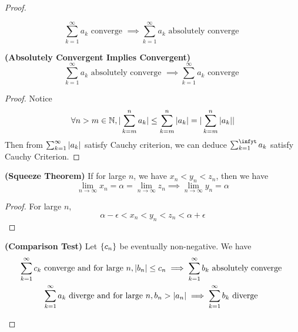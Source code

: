\documentclass{report}
\begin{document}
\begin{proof}
\begin{theorem}
\begin{equation}
\sum_{k=1}^\infty a_k\text{ converge }\implies \sum_{k=1}^\infty a_k\text{ absolutely converge }
\end{equation}
\end{theorem}
\begin{theorem}
\label{4.2.5}
\textbf{(Absolutely Convergent Implies Convergent)} 
\begin{equation}
\sum_{k=1}^\infty a_k\text{ absolutely converge }\implies \sum_{k=1}^\infty a_k\text{ converge }
\end{equation}
\end{theorem}
\begin{proof}
Notice 
\begin{equation}
\forall n>m \in\mathbb{N}, |\sum_{k=m}^n a_k|\leq \sum_{k=m}^n |a_k|=|\sum_{k=m}^n |a_k||
\end{equation}
Then from $\sum_{k=1}^\infty |a_k|$ satisfy Cauchy criterion, we can deduce $\sum_{k=1}^\infyt a_k$ satisfy Cauchy Criterion. 
\end{proof}
\begin{theorem}
\label{4.2.6}
\textbf{(Squeeze Theorem)} If for large $n$, we have  $x_n<y_n<z_n$, then we have
 \begin{equation}
\lim_{n\to\infty}x_n=\alpha =\lim_{n\to\infty}z_n\implies \lim_{n\to\infty}y_n=\alpha 
\end{equation}
\end{theorem}
\begin{proof}
For large $n$, 
 \begin{equation}
\alpha -\epsilon <x_n<y_n<z_n<\alpha +\epsilon 
\end{equation}
\end{proof}
\begin{theorem}
\label{4.2.7}
\textbf{(Comparison Test)} Let $\{ c_n \}$ be eventually non-negative. We have
\begin{gather}
  \sum_{k=1}^\infty c_k\text{ converge and for large }n, |b_n|\leq c_n\implies \sum_{k=1}^\infty b_k\text{ absolutely converge }\\
  \sum_{k=1}^\infty a_k\text{ diverge and for large $n$}, b_n>|a_n|\implies \sum_{k=1}^\infty b_k\text{ diverge }
\end{gather}

\end{theorem}
\end{proof}
\end{document}
